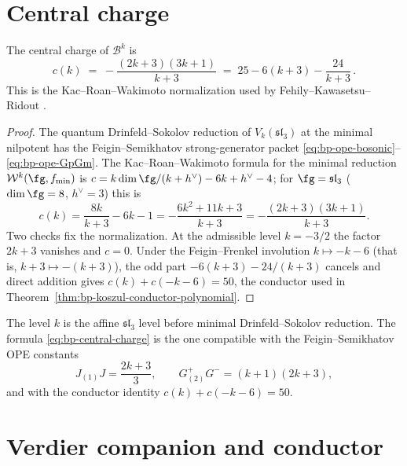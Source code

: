 \section{Central charge}\label{sec:bp-central-charge}

\begin{proposition}
\label{prop:bp-central-charge}
The central charge of $\mathcal{B}^k$ is
\begin{equation}\label{eq:bp-central-charge}
c(k) \;=\; -\frac{(2k+3)(3k+1)}{k+3}
\;=\; 25 - 6(k+3) - \frac{24}{k+3}\,.
\end{equation}
This is the Kac--Roan--Wakimoto normalization
used by Fehily--Kawasetsu--Ridout
\cite[Eq.~\textup{(}2.2\textup{)}]{FKR20}.
\end{proposition}

\begin{proof}
The quantum Drinfeld--Sokolov reduction of
$V_k(\mathfrak{sl}_3)$ at the minimal nilpotent has the
Feigin--Semikhatov strong-generator packet
\eqref{eq:bp-ope-bosonic}--\eqref{eq:bp-ope-GpGm}. The
Kac--Roan--Wakimoto formula for the minimal reduction
$\mathcal{W}^k(\fg, f_{\min})$ is
$c = k\dim\fg/(k+h^\vee) - 6k + h^\vee - 4$; for
$\fg = \mathfrak{sl}_3$ ($\dim\fg = 8$, $h^\vee = 3$) this is
\[
c(k)=\frac{8k}{k+3}-6k-1
=-\frac{6k^2+11k+3}{k+3}
=-\frac{(2k+3)(3k+1)}{k+3}.
\]
Two checks fix the normalization. At the admissible level
$k=-3/2$ the factor $2k+3$ vanishes and $c=0$. Under the
Feigin--Frenkel involution
$k\mapsto -k-6$ (that is, $k+3 \mapsto -(k+3)$), the odd part
$-6(k+3)-24/(k+3)$ cancels and direct addition gives
$c(k)+c(-k-6)=50$, the conductor used in
Theorem~\ref{thm:bp-koszul-conductor-polynomial}.
\end{proof}

\begin{remark}[Normalization]
\label{rem:bp-convention}
The level $k$ is the affine $\mathfrak{sl}_3$ level before
minimal Drinfeld--Sokolov reduction. The formula
\eqref{eq:bp-central-charge} is the one compatible with the
Feigin--Semikhatov OPE constants
\[
J_{(1)}J=\frac{2k+3}{3},\qquad
G^+_{(2)}G^-=(k+1)(2k+3),
\]
and with the conductor identity $c(k)+c(-k-6)=50$.
\end{remark}


\section{Verdier companion and conductor}\label{sec:bp-koszul}

